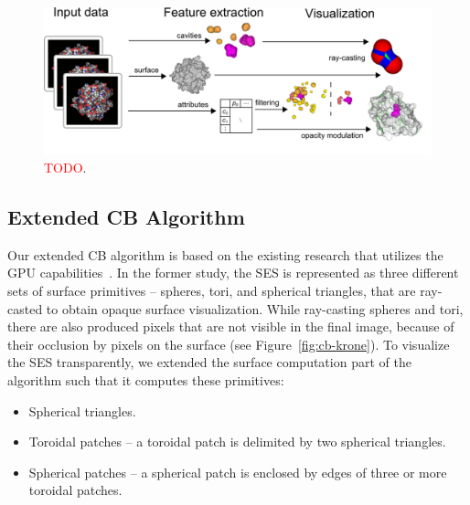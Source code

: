 \begin{figure}[htb]
  \centering
  \includegraphics[width=7.3in]{image/overview.png}
  \caption{\textcolor{red}{TODO}.}
	\label{fig:overview}
\end{figure}

\subsection{Extended CB Algorithm}
\label{sec:ecb}
Our extended CB algorithm is based on the existing research that utilizes the GPU capabilities~\cite{krone2011parallel}.
In the former study, the SES is represented as three different sets of surface primitives -- spheres, tori, and spherical triangles, that are ray-casted to obtain opaque surface visualization. 
While ray-casting spheres and tori, there are also produced pixels that are not visible in the final image, because of their occlusion by pixels on the surface (see Figure~\ref{fig:cb-krone}).
To visualize the SES transparently, we extended the surface computation part of the algorithm such that it computes these primitives:
\begin{itemize}
	\item Spherical triangles.
  \item Toroidal patches -- a toroidal patch is delimited by two spherical triangles.
	\item Spherical patches -- a spherical patch is enclosed by edges of three or more toroidal patches.
\end{itemize}

